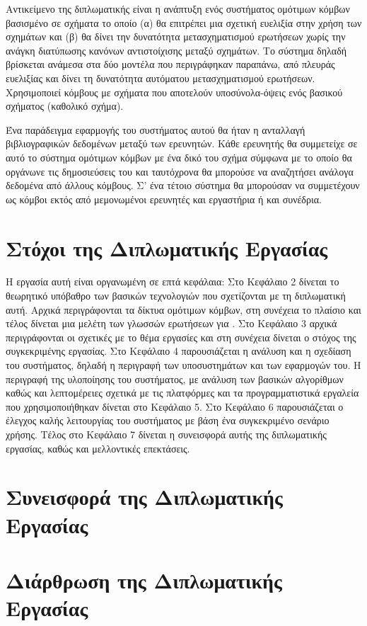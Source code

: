 Αντικείμενο της διπλωματικής είναι η ανάπτυξη ενός συστήματος
ομότιμων κόμβων βασισμένο σε σχήματα το οποίο (α) θα επιτρέπει μια
σχετική ευελιξία στην χρήση των σχημάτων και (β) θα δίνει την
δυνατότητα μετασχηματισμού ερωτήσεων χωρίς την ανάγκη διατύπωσης
κανόνων αντιστοίχισης μεταξύ σχημάτων. Το σύστημα δηλαδή βρίσκεται
ανάμεσα στα δύο μοντέλα που περιγράφηκαν παραπάνω, από πλευράς
ευελιξίας και δίνει τη δυνατότητα αυτόματου μετασχηματισμού
ερωτήσεων. Χρησιμοποιεί κόμβους με σχήματα  που αποτελούν
υποσύνολα-όψεις  ενός βασικού σχήματος (καθολικό
σχήμα).

Ένα παράδειγμα εφαρμογής του συστήματος αυτού θα ήταν η ανταλλαγή
βιβλιογραφικών δεδομένων μεταξύ των ερευνητών. Κάθε ερευνητής θα
συμμετείχε σε αυτό το σύστημα ομότιμων κόμβων με ένα δικό του
 σχήμα σύμφωνα με το οποίο θα οργάνωνε τις δημοσιεύσεις
του και ταυτόχρονα θα μπορούσε να αναζητήσει ανάλογα δεδομένα από
άλλους κόμβους. Σ' ένα τέτοιο σύστημα θα μπορούσαν να συμμετέχουν
ως κόμβοι εκτός από μεμονωμένοι ερευνητές και εργαστήρια ή και
συνέδρια.

\section{Στόχοι της Διπλωματικής Εργασίας}
Η εργασία αυτή είναι οργανωμένη σε επτά κεφάλαια: Στο Κεφάλαιο 2
δίνεται το θεωρητικό υπόβαθρο των βασικών τεχνολογιών που
σχετίζονται με τη διπλωματική αυτή. Αρχικά περιγράφονται τα δίκτυα
ομότιμων κόμβων, στη συνέχεια το πλαίσιο  και τέλος
δίνεται μια μελέτη των γλωσσών ερωτήσεων για . Στο
Κεφάλαιο 3 αρχικά περιγράφονται οι σχετικές με το θέμα εργασίες
και στη συνέχεια δίνεται ο στόχος της συγκεκριμένης εργασίας. Στο
Κεφάλαιο 4 παρουσιάζεται η ανάλυση και η σχεδίαση του συστήματος,
δηλαδή η περιγραφή των υποσυστημάτων και των εφαρμογών του. Η
περιγραφή της υλοποίησης του συστήματος, με ανάλυση των βασικών
αλγορίθμων καθώς και λεπτομέρειες σχετικά με τις πλατφόρμες και τα
προγραμματιστικά εργαλεία που χρησιμοποιήθηκαν δίνεται στο
Κεφάλαιο 5. Στο Κεφάλαιο 6 παρουσιάζεται ο έλεγχος καλής
λειτουργίας του συστήματος με βάση ένα συγκεκριμένο σενάριο
χρήσης. Τέλος στο Κεφάλαιο 7 δίνεται η συνεισφορά αυτής της
διπλωματικής εργασίας, καθώς και μελλοντικές επεκτάσεις.

\section{Συνεισφορά της Διπλωματικής Εργασίας}

\section{Διάρθρωση της Διπλωματικής Εργασίας}

